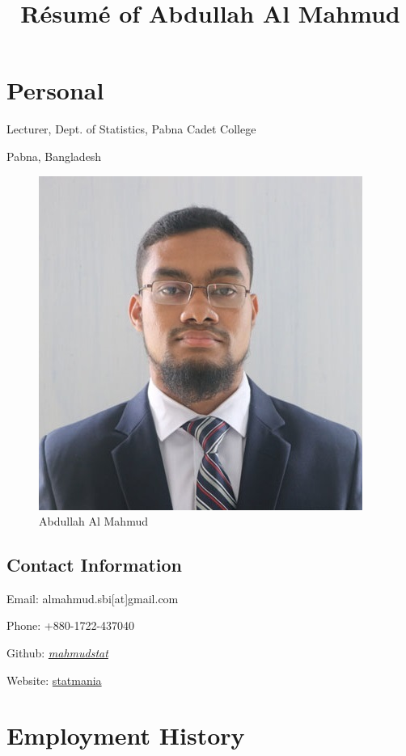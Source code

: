 \documentclass[
]{book}
\title{Résumé of Abdullah Al Mahmud}
\author{}
\date{\vspace{-2.5em}}
\begin{document}
\maketitle

{
\setcounter{tocdepth}{1}
\tableofcontents
}
\hypertarget{personal}{%
\chapter*{Personal}\label{personal}}

Lecturer, Dept. of Statistics, Pabna Cadet College

Pabna, Bangladesh

\begin{figure}

{\centering \includegraphics[width=0.35\linewidth]{mahmud} 

}

\caption{Abdullah Al Mahmud}\label{fig:cover}
\end{figure}

\hypertarget{contact-information}{%
\section*{Contact Information}\label{contact-information}}

Email: almahmud.sbi{[}at{]}gmail.com

Phone: +880-1722-437040

Github: \href{https://github.com/mahmudstat}{\emph{mahmudstat}}

Website: \href{mahmud.statmania.info}{statmania}

\hypertarget{employment-history}{%
\chapter*{Employment History}\label{employment-history}}
\end{document}
